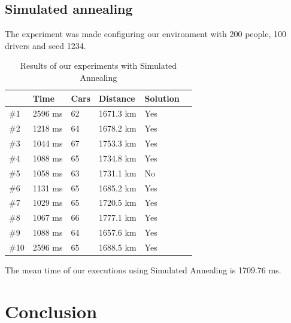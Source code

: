 \documentclass[12]{article}
\begin{document}
\subsection{Simulated annealing}
The experiment was made configuring our environment with 200 people, 100 drivers and seed 1234.
\\


\begin{table}[H]
\centering
\begin{tabular}{|l|l|l|l|l|l|}
\hline & \textbf{Time}  & \textbf{Cars} & \textbf{Distance} & \textbf{Solution}\\  \hline
 \#1 & 2596 ms  & 62 & 1671.3 km & Yes \\ \hline
 \#2 & 1218 ms & 64 & 1678.2 km & Yes \\ \hline
  \#3 & 1044 ms & 67 & 1753.3 km & Yes \\ \hline
 \#4 & 1088 ms & 65 & 1734.8 km & Yes \\ \hline
 \#5 & 1058 ms & 63 & 1731.1 km & No \\ \hline
 \#6 & 1131 ms & 65 & 1685.2 km & Yes \\ \hline
 \#7 & 1029 ms & 65 & 1720.5 km & Yes \\ \hline
 \#8 & 1067 ms & 66 & 1777.1 km & Yes \\ \hline
 \#9 & 1088 ms & 64 & 1657.6 km & Yes\\ \hline
 \#10 & 2596 ms & 65 & 1688.5 km & Yes \\ \hline

\end{tabular}
\caption{Results of our experiments with Simulated Annealing}
\label{Results2}
\end{table}

The mean time of our executions using Simulated Annealing is 1709.76 ms. 

\section{Conclusion}
\end{document}
